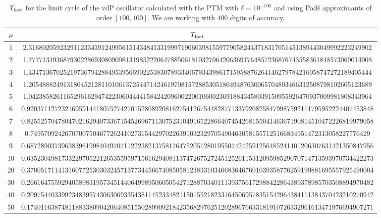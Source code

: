 \documentclass[final]{article}
\begin{document}
\begin{table}
\caption{$T_{\rm fast}$ for the limit cycle of the vdP oscillator calculated with the PTM with $\delta=10^{-100}$ and using Pad\'e approximants of order $[100,100]$. We are working with $400$ digits of accuracy. }
\bigskip
\label{table_tfast_vdP1}
\begin{center}
\begin{tabular}{|c|c|}
\hline
$\mu$ &   $T_{\rm fast}$    \\
\hline
1   &   2.316802059232911233439124995615143484133199971906039815597790582443718317051451389443049992223249902   \\
2   &   1.777713493687930228693080909813198522206478850618103270642063691764857236876743558361848573069014008   \\
3   &   1.434713670252197367942884953956690225383078933406793439861715958876264146279784216058747272189405444   \\
4   &   1.205488824913180452128110106137254471424619708157288530518049487630065704803466312508798102605123689   \\
5   &   1.042385826116529616294742230604444158424209600220010600236918843458039150955926470937009981808343964   \\
6   &   0.9203711272321695914418075274270152808920816275412675448287713379208258479987592111795952224407453848  \\
7   &   0.8255257047804702162940733671545269671130752310491652286640745426815504146367190814510472226819979058  \\
8   &   0.74957092426707007504677262410273154429702263910323297054904630581557125166834951472313058227776429    \\
9   &   0.6872890373963839619984049707112223821375817647520512801955074242591256485241401206307631421350847956  \\
10  &   0.6352304981733229705221265355959715616294081137472675272451252611531209598529070714713593970734422273  \\
20  &   0.3700517114131607725303032457137734456674085058123833103466836467601039358776259199881695557925490004  \\
30  &   0.2661647559294058983195734514406499895060505427128870340111393756172988422864389378985703508894970482  \\
40  &   0.2097544033992348395743063069335438114523348211501552182331645069578351542964384111384370423210270942  \\
50  &   0.1740116387481188338090420640851550289909218423568297625120289676633181910726332961613471976694907271  \\

\end{tabular}
\end{center}
\end{table}
\end{document}
